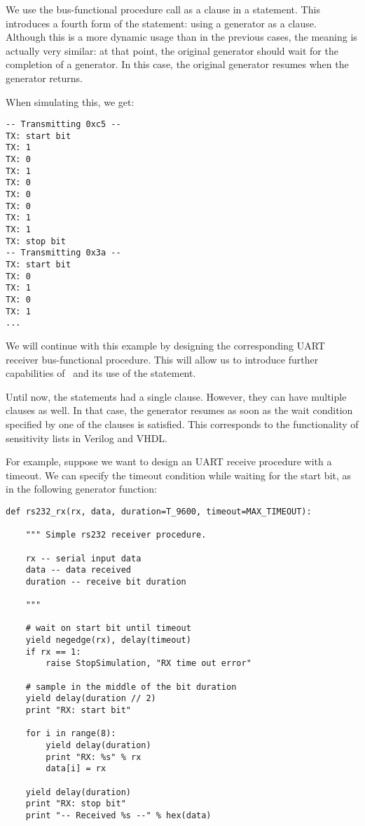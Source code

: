 We use the bus-functional procedure call as a clause in a
 statement. This introduces a fourth form of the
 statement: using a generator as a clause. Although this is
a more dynamic usage than in the previous cases, the meaning is
actually very similar: at that point,
the original generator should 
wait for the completion of a generator. 
In this case, the original generator resumes when the
 generator returns.

When simulating this, we get:

\begin{verbatim}
-- Transmitting 0xc5 --
TX: start bit
TX: 1
TX: 0
TX: 1
TX: 0
TX: 0
TX: 0
TX: 1
TX: 1
TX: stop bit
-- Transmitting 0x3a --
TX: start bit
TX: 0
TX: 1
TX: 0
TX: 1
...
\end{verbatim}

We will continue with this example by designing the corresponding UART
receiver bus-functional procedure. This will allow us to introduce
further capabilities of \myhdl\ and its use of the 
statement. 

Until now, the  statements had a single clause. However,
they can have multiple clauses as well. In that case, the generator
resumes as soon as the wait condition specified by one
of the clauses is satisfied. This corresponds to the functionality of
sensitivity lists in Verilog and VHDL.

For example, suppose we want to design an UART receive procedure with
a timeout. We can specify the timeout condition while waiting for the
start bit, as in the following generator function:

\begin{verbatim}
def rs232_rx(rx, data, duration=T_9600, timeout=MAX_TIMEOUT):
    
    """ Simple rs232 receiver procedure.

    rx -- serial input data
    data -- data received
    duration -- receive bit duration
    
    """

    # wait on start bit until timeout
    yield negedge(rx), delay(timeout)
    if rx == 1:
        raise StopSimulation, "RX time out error"

    # sample in the middle of the bit duration
    yield delay(duration // 2)
    print "RX: start bit"

    for i in range(8):
        yield delay(duration)
        print "RX: %s" % rx
        data[i] = rx

    yield delay(duration)
    print "RX: stop bit"
    print "-- Received %s --" % hex(data)
\end{verbatim}

